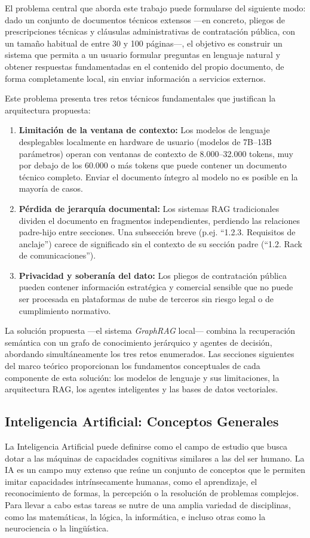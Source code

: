 El problema central que aborda este trabajo puede formularse del siguiente modo: dado un conjunto de documentos técnicos extensos —en concreto, pliegos de prescripciones técnicas y cláusulas administrativas de contratación pública, con un tamaño habitual de entre 30 y 100 páginas—, el objetivo es construir un sistema que permita a un usuario formular preguntas en lenguaje natural y obtener respuestas fundamentadas en el contenido del propio documento, de forma completamente local, sin enviar información a servicios externos.

Este problema presenta tres retos técnicos fundamentales que justifican la arquitectura propuesta:

\begin{enumerate}
    \item \textbf{Limitación de la ventana de contexto:} Los modelos de lenguaje desplegables localmente en hardware de usuario (modelos de 7B--13B parámetros) operan con ventanas de contexto de 8.000--32.000 tokens, muy por debajo de los 60.000 o más tokens que puede contener un documento técnico completo. Enviar el documento íntegro al modelo no es posible en la mayoría de casos.
    \item \textbf{Pérdida de jerarquía documental:} Los sistemas RAG tradicionales dividen el documento en fragmentos independientes, perdiendo las relaciones padre-hijo entre secciones. Una subsección breve (p.ej. ``1.2.3. Requisitos de anclaje'') carece de significado sin el contexto de su sección padre (``1.2. Rack de comunicaciones'').
    \item \textbf{Privacidad y soberanía del dato:} Los pliegos de contratación pública pueden contener información estratégica y comercial sensible que no puede ser procesada en plataformas de nube de terceros sin riesgo legal o de cumplimiento normativo.
\end{enumerate}

La solución propuesta —el sistema \textit{GraphRAG} local— combina la recuperación semántica con un grafo de conocimiento jerárquico y agentes de decisión, abordando simultáneamente los tres retos enumerados. Las secciones siguientes del marco teórico proporcionan los fundamentos conceptuales de cada componente de esta solución: los modelos de lenguaje y sus limitaciones, la arquitectura RAG, los agentes inteligentes y las bases de datos vectoriales.

\subsection{Inteligencia Artificial: Conceptos Generales}
La Inteligencia Artificial puede definirse como el campo de estudio que busca dotar a las máquinas de capacidades cognitivas similares a las del ser humano.
La IA es un campo muy extenso que reúne un conjunto de conceptos que le permiten imitar capacidades intrínsecamente humanas, como el aprendizaje, el reconocimiento de formas, la percepción o la resolución de problemas complejos.
Para llevar a cabo estas tareas se nutre de una amplia variedad de disciplinas, como las matemáticas, la lógica, la informática, e incluso otras como la neurociencia o la lingüística.

